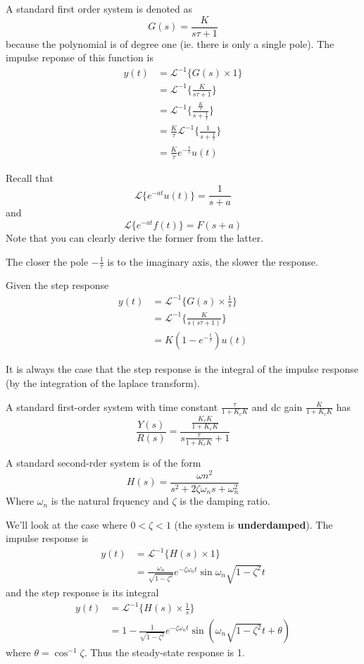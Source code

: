 \documentclass[12pt]{article}
\newcommand{\laplace}[1]{\ensuremath{\mathcal{L} \{#1\}}}
\newcommand{\invlaplace}[1]{\ensuremath{\mathcal{L}^{-1} \{#1\}}}
\begin{document}
A standard first order system is denoted as \[ G(s) = \frac{K}{s\tau + 1} \] because the polynomial is of degree one (ie. there is only a single pole). The impulse reponse of this function is
\begin{align*}
y(t) &= \invlaplace{G(s) \times 1} \\
&= \invlaplace{\frac{K}{s\tau + 1}} \\
&= \invlaplace{\frac{\frac{K}{\tau}}{s + \frac{1}{\tau}}} \\
&= \frac{K}{\tau} \invlaplace{\frac{1}{s+\frac{1}{\tau}}} \\
&= \frac{K}{\tau} e^{-\frac{t}{\tau}} u(t)
\end{align*}

Recall that \[ \laplace{e^{-at} u(t)} = \frac{1}{s + a} \] and \[ \laplace{e^{-at} f(t)} = F(s + a) \] Note that you can clearly derive the former from the latter.

The closer the pole $-\frac{1}{\tau}$ is to the imaginary axis, the slower the response.

Given the step response
\begin{align*}
y(t) &= \invlaplace{G(s) \times \frac{1}{s}} \\
&= \invlaplace{\frac{K}{s(s\tau + 1)}} \\
&= K(1 - e^{-\frac{t}{\tau}}) u(t)
\end{align*}

It is always the case that the step response is the integral of the impulse response (by the integration of the laplace transform).

A standard first-order system with time constant $\frac{\tau}{1 + K_c K}$ and dc gain $\frac{K}{1 + K_c K}$ has \[ \frac{Y(s)}{R(s)} = \frac{\frac{K_c K}{1 + K_c K}}{s\frac{\tau}{1 + K_c K} + 1} \]

A standard second-rder system is of the form \[ H(s) = \frac{\omega n^2}{s^2 + 2\zeta \omega_n s + \omega_n^2} \] Where $\omega_n$ is the natural frquency and $\zeta$ is the damping ratio.

We'll look at the case where $0 < \zeta < 1$ (the system is {\bf underdamped}). The impulse response is
\begin{align*}
y(t) &= \invlaplace{H(s) \times 1} \\
&= \frac{\omega_n}{\sqrt{1 - \zeta^2}} e^{-\zeta\omega_n t} \sin\omega_n\sqrt{1 - \zeta^2} t
\end{align*}
and the step response is its integral
\begin{align*}
y(t) &= \invlaplace{H(s) \times \frac{1}{s}} \\
&= 1 - \frac{1}{\sqrt{1 - \zeta^2}} e^{-\zeta\omega_n t} \sin(\omega_n\sqrt{1 - \zeta^2} t + \theta)
\end{align*}
where $\theta = \cos^{-1} \zeta$. Thus the steady-state response is 1.
\end{document}
